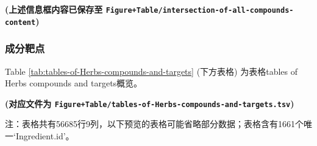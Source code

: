 \documentclass[
]{article}
\begin{document}
\textbf{(上述信息框内容已保存至 \texttt{Figure+Table/intersection-of-all-compounds-content})}

\hypertarget{ux6210ux5206ux9776ux70b9}{%
\subsubsection{成分靶点}\label{ux6210ux5206ux9776ux70b9}}

Table \ref{tab:tables-of-Herbs-compounds-and-targets} (下方表格) 为表格tables of Herbs compounds and targets概览。

\textbf{(对应文件为 \texttt{Figure+Table/tables-of-Herbs-compounds-and-targets.tsv})}

\begin{center}\begin{tcolorbox}[colback=gray!10, colframe=gray!50, width=0.9\linewidth, arc=1mm, boxrule=0.5pt]注：表格共有56685行9列，以下预览的表格可能省略部分数据；表格含有1661个唯一`Ingredient.id'。
\end{tcolorbox}
\end{center}
\end{document}
